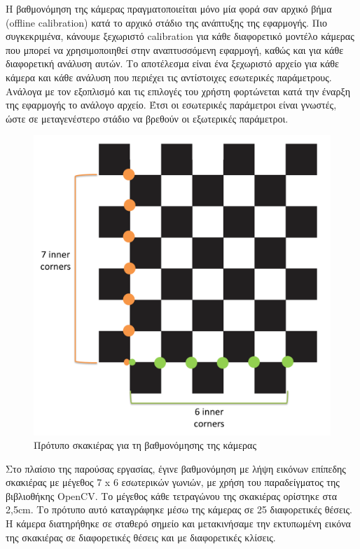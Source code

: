 Η βαθμονόμηση της κάμερας πραγματοποιείται μόνο μία φορά σαν αρχικό βήμα (offline calibration) κατά το αρχικό στάδιο της ανάπτυξης της εφαρμογής. Πιο συγκεκριμένα, κάνουμε ξεχωριστό calibration για κάθε διαφορετικό μοντέλο κάμερας που μπορεί να χρησιμοποιηθεί στην αναπτυσσόμενη εφαρμογή, καθώς και για κάθε διαφορετική ανάλυση αυτών. Το αποτέλεσμα είναι ένα ξεχωριστό αρχείο για κάθε κάμερα και κάθε ανάλυση που περιέχει τις αντίστοιχες εσωτερικές παράμετρους. Ανάλογα με τον εξοπλισμό και τις επιλογές του χρήστη φορτώνεται κατά την έναρξη της εφαρμογής το ανάλογο αρχείο. Έτσι οι εσωτερικές παράμετροι είναι γνωστές, ώστε σε μεταγενέστερο στάδιο να βρεθούν οι εξωτερικές παράμετροι.



\begin{figure}[H]
    \centering
    \includegraphics[scale=0.3, angle=0]{Files/Figures/pattern.png}
    \caption[Πρότυπο σκακιέρας για τη βαθμονόμησης της κάμερας]{Πρότυπο σκακιέρας για τη βαθμονόμησης της κάμερας}
    \label{fig:pattern}
\end{figure}




Στο πλαίσιο της παρούσας εργασίας, έγινε βαθμονόμηση με λήψη εικόνων επίπεδης σκακιέρας με μέγεθος 7 x 6 εσωτερικών γωνιών, με χρήση του παραδείγματος της βιβλιοθήκης OpenCV. Το μέγεθος κάθε τετραγώνου της σκακιέρας ορίστηκε στα 2,5cm. Το πρότυπο αυτό καταγράφηκε μέσω της κάμερας σε 25 διαφορετικές θέσεις. Η κάμερα διατηρήθηκε σε σταθερό σημείο και μετακινήσαμε την εκτυπωμένη εικόνα της σκακιέρας σε διαφορετικές θέσεις και με διαφορετικές κλίσεις. 






